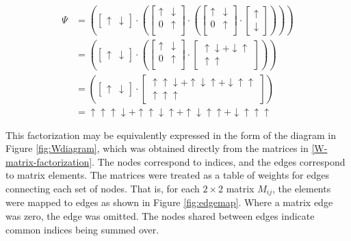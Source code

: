 \documentclass[12pt]{amsbook}
\theoremstyle{plain}
\theoremstyle{definition}
\theoremstyle{remark}
\newcommand{\bmat}[4]{
\begin{bmatrix}
#1 & #2\\
#3 & #4\\
\end{bmatrix}
}
\newcommand{\paren}[1]{\left(#1\right)}
\begin{document}
$$
\begin{aligned}
  \Psi &= \paren{\begin{bmatrix}\uparrow & \downarrow \end{bmatrix}\cdot
          \paren{\bmat{\uparrow}{\downarrow}{0}{\uparrow}\cdot
          \paren{\bmat{\uparrow}{\downarrow}{0}{\uparrow}\cdot
          \begin{bmatrix}\uparrow \\ \downarrow \end{bmatrix}}}}\\
       &= \paren{\begin{bmatrix}\uparrow & \downarrow \end{bmatrix}\cdot
          \paren{\bmat{\uparrow}{\downarrow}{0}{\uparrow}\cdot
          \begin{bmatrix}\uparrow\downarrow+\downarrow\uparrow \\ \uparrow\uparrow \end{bmatrix}}}\\
       &= \paren{\begin{bmatrix}\uparrow & \downarrow \end{bmatrix}\cdot
          \begin{bmatrix}\uparrow\uparrow\downarrow+\uparrow\downarrow\uparrow+ \downarrow\uparrow\uparrow \\ \uparrow\uparrow\uparrow \end{bmatrix}}\\
       &= \uparrow\uparrow\uparrow\downarrow + \uparrow\uparrow\downarrow\uparrow + \uparrow\downarrow\uparrow\uparrow + \downarrow\uparrow\uparrow\uparrow
\end{aligned}
$$

This factorization may be equivalently expressed in the form of the diagram in Figure \ref{fig:Wdiagram}, which was obtained directly from the matrices in \eqref{W-matrix-factorization}.  The nodes correspond to indices, and the edges correspond to matrix elements.  The matrices were treated as a table of weights for edges connecting each set of nodes.  That is, for each $2\times 2$ matrix $M_{ij}$, the elements were mapped to edges as shown in Figure \ref{fig:edgemap}.  Where a matrix edge was zero, the edge was omitted.  The nodes shared between edges indicate common indices being summed over.
\end{document}
